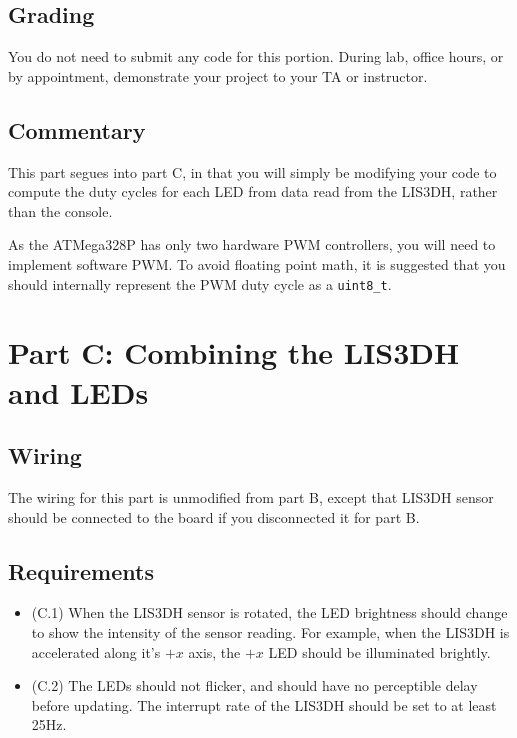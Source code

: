 \documentclass{article}
\begin{document}
\subsection{Grading}

You do not need to submit any code for this portion. During lab, office hours,
or by appointment, demonstrate your project to your TA or instructor.

\subsection{Commentary}

This part segues into part C, in that you will simply be modifying your code to
compute the duty cycles for each LED from data read from the LIS3DH, rather
than the console.

As the ATMega328P has only two hardware PWM controllers, you will need to
implement software PWM. To avoid floating point math, it is suggested that you
should internally represent the PWM duty cycle as a \texttt{uint8\_t}.

\section{Part C: Combining the LIS3DH and LEDs}

\subsection{Wiring}

The wiring for this part is unmodified from part B, except that LIS3DH sensor
should be connected to the board if you disconnected it for part B.

\subsection{Requirements}

\begin{itemize}

	\item (C.1) When the LIS3DH sensor is rotated, the LED brightness
		should change to show the intensity of the sensor reading. For
		example, when the LIS3DH is accelerated along it's $+x$ axis,
		the $+x$ LED should be illuminated brightly.

	\item (C.2) The LEDs should not flicker, and should have no perceptible
		delay before updating. The interrupt rate of the LIS3DH should
		be set to at least 25Hz.

\end{itemize}
\end{document}
